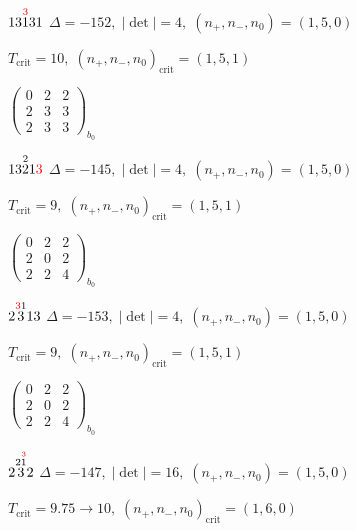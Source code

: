 \documentclass[10pt]{article}
\begin{document}
\smallskip

$13\overset{\textcolor{red}{3}}{1}31$ \quad $\Delta=-152,\; |\det|=4,\; (n_+,n_-,n_0)=(1,5,0)$

\hspace{1em}$T_{\text{crit}}=10,\; (n_+,n_-,n_0)_{\text{crit}}=(1,5,1)$

\hspace{2em}$\left(\begin{smallmatrix}0 & 2 & 2 \\ 2 & 3 & 3 \\ 2 & 3 & 3\end{smallmatrix}\right)_{\!b_0}$

\smallskip

$13\overset{2}{2}1\textcolor{red}{3}$ \quad $\Delta=-145,\; |\det|=4,\; (n_+,n_-,n_0)=(1,5,0)$

\hspace{1em}$T_{\text{crit}}=9,\; (n_+,n_-,n_0)_{\text{crit}}=(1,5,1)$

\hspace{2em}$\left(\begin{smallmatrix}0 & 2 & 2 \\ 2 & 0 & 2 \\ 2 & 2 & 4\end{smallmatrix}\right)_{\!b_0}$

\smallskip

$2\overset{\textcolor{red}{3}1}{3}13$ \quad $\Delta=-153,\; |\det|=4,\; (n_+,n_-,n_0)=(1,5,0)$

\hspace{1em}$T_{\text{crit}}=9,\; (n_+,n_-,n_0)_{\text{crit}}=(1,5,1)$

\hspace{2em}$\left(\begin{smallmatrix}0 & 2 & 2 \\ 2 & 0 & 2 \\ 2 & 2 & 4\end{smallmatrix}\right)_{\!b_0}$

\smallskip

$2\overset{2\overset{\textcolor{red}{3}}{1}}{3}2$ \quad $\Delta=-147,\; |\det|=16,\; (n_+,n_-,n_0)=(1,5,0)$

\hspace{1em}$T_{\text{crit}}=9.75 \to 10,\; (n_+,n_-,n_0)_{\text{crit}}=(1,6,0)$
\end{document}
